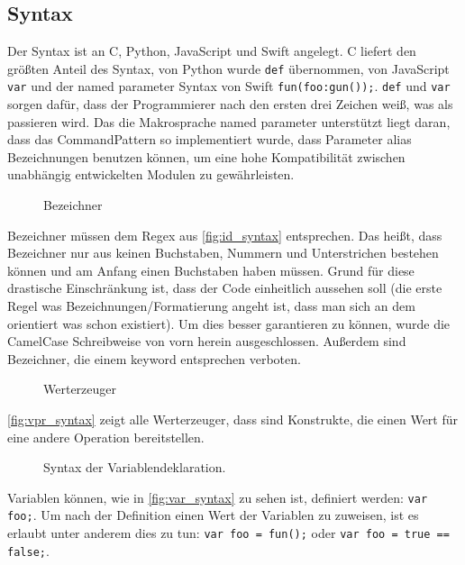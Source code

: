   \subsection{Syntax}
  \label{ssec:Syntax}
    Der Syntax ist an C, Python, JavaScript und Swift angelegt. C liefert den größten Anteil des Syntax, von Python wurde \lstinline[style=MyMacroStyle]$def$ übernommen, von JavaScript \lstinline[style=MyMacroStyle]$var$ und der named parameter Syntax von Swift \lstinline[style=MyMacroStyle]$fun(foo:gun());$.  \lstinline[style=MyMacroStyle]$def$ und \lstinline[style=MyMacroStyle]$var$ sorgen dafür, dass der Programmierer nach den ersten drei Zeichen weiß, was als passieren wird. Das die Makrosprache named parameter unterstützt liegt daran, dass das CommandPattern so implementiert wurde, dass Parameter alias Bezeichnungen benutzen können, um eine hohe Kompatibilität zwischen unabhängig entwickelten Modulen zu gewährleisten.

    \begin{figure}[H]
      \centering
      
      \caption{Bezeichner}
      \label{fig:id_syntax}
    \end{figure}
    Bezeichner müssen dem Regex aus \autoref{fig:id_syntax} entsprechen. Das heißt, dass Bezeichner nur aus keinen Buchstaben, Nummern und Unterstrichen bestehen können und am Anfang einen Buchstaben haben müssen. Grund für diese drastische Einschränkung ist, dass der Code einheitlich aussehen soll (die erste Regel was Bezeichnungen/Formatierung angeht ist, dass man sich an dem orientiert was schon existiert). Um dies besser garantieren zu können, wurde die CamelCase Schreibweise von vorn herein ausgeschlossen. Außerdem sind Bezeichner, die einem keyword entsprechen verboten.

    \begin{figure}[H]
      \centering
      
      \caption{Werterzeuger}
      \label{fig:vpr_syntax}
    \end{figure}
    \autoref{fig:vpr_syntax} zeigt alle Werterzeuger, dass sind Konstrukte, die einen Wert für eine andere Operation bereitstellen.

    \begin{figure}[H]
      \centering
      
      \caption{Syntax der Variablendeklaration.}
      \label{fig:var_syntax}
    \end{figure}
    Variablen können, wie in \autoref{fig:var_syntax} zu sehen ist, definiert werden: \lstinline[style=MyMacroStyle]$var foo;$. Um nach der Definition einen Wert der Variablen zu zuweisen, ist es erlaubt unter anderem dies zu tun: \lstinline[style=MyMacroStyle]$var foo = fun();$ oder \lstinline[style=MyMacroStyle]$var foo = true == false;$.

